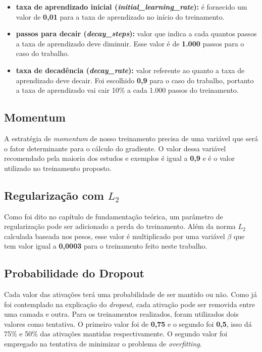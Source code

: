 \begin{itemize}
  
  \item {\bf taxa de aprendizado inicial
      (\emph{initial\_learning\_rate}):} é fornecido um valor de
    {\bf 0,01} para a taxa de aprendizado no início do treinamento.

  \item {\bf passos para decair (\emph{decay\_steps}):} valor que
    indica a cada quantos passos a taxa de aprendizado deve
    diminuir. Esse valor é de {\bf 1.000} passos para o caso do
    trabalho.

  \item {\bf taxa de decadência (\emph{decay\_rate}):} valor referente
    ao quanto a taxa de aprendizado deve decair. Foi escolhido {\bf
      0,9} para o caso do trabalho, portanto a taxa de aprendizado vai
    cair 10\% a cada 1.000 passos do treinamento.

\end{itemize}

\subsection{Momentum}

A estratégia de \textit{momentum} de nosso treinamento precisa de uma
variável que será o fator determinante para o cálculo do gradiente. O
valor dessa variável recomendado pela maioria dos estudos e exemplos é
igual a {\bf 0,9} e é o valor utilizado no treinamento proposto.

\subsection{Regularização com $L_2$}

Como foi dito no capítulo de fundamentação teórica, um parâmetro de
regularização pode ser adicionado a perda do treinamento. Além da
norma $L_2$ calculada baseada nos pesos, esse valor é multiplicado por
uma variável $\beta$ que tem valor igual a {\bf 0,0003} para o
treinamento feito neste trabalho.

\subsection{Probabilidade do Dropout}

Cada valor das ativações terá uma probabilidade de ser mantido ou
não. Como já foi contemplado na explicação do \textit{dropout}, cada
ativação pode ser removida entre uma camada e outra. Para os
treinamentos realizados, foram utilizados dois valores como
tentativa. O primeiro valor foi de {\bf 0,75} e o segundo foi {\bf
  0,5}, isso dá 75\% e 50\% das ativações mantidas respectivamente. O
segundo valor foi empregado na tentativa de minimizar o problema de
\textit{overfitting}.

